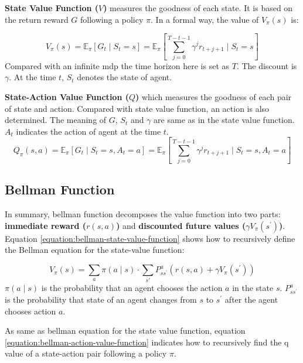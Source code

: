 \textbf{State Value Function ($V$)} measures the goodness of each state. It is based on the return reward $G$ following a policy $\pi$. In a formal way, the value of $V_\pi(s)$ is:

\begin{equation} 
V_{\pi}(s)=\mathbb{E}_{\pi}\left[G_{t} \mid S_{t}=s \right]=\mathbb{E}_{\pi}\left[\sum_{j=0}^{T-t-1} \gamma^{j} r_{t+j+1} \mid S_{t}=s\right]
\end{equation}
Compared with an infinite \gls{mdp} the time horizon here is set as $T$. The discount is $\gamma$. At the time $t$, $S_t$ denotes the state of agent.

\textbf{State-Action Value Function ($Q$)} which measures the goodness of each pair of state and action. Compared with state value function, an action is also determined. The meaning of $G$, $S_t$ and $\gamma$ are same as in the state value function. $A_t$ indicates the action of agent at the time $t$.
\begin{equation}
Q_{\pi}(s, a)=\mathbb{E}_{\pi}\left[G_{t} \mid S_{t}=s, A_{t}=a\right]=\mathbb{E}_{\pi}\left[\sum_{j=0}^{T-t-1} \gamma^{j} r_{t+j+1} \mid S_{t}=s, A_{t}=a\right]
\end{equation}

\subsection{Bellman Function}
In summary, bellman function decomposes the value function into two parts: \textbf{immediate reward ($r(s, a)$)} and \textbf{discounted future values ($\gamma V_{\pi}\left(s^{\prime}\right)$)}.
Equation \ref{equation:bellman-state-value-function} shows how to recursively define the Bellman equation for the state-value function:

\begin{equation} \label{equation:bellman-state-value-function}
V_{\pi}(s)=\sum_{a} \pi(a \mid s) \cdot \sum_{s \prime} P_{s s^{\prime}}^{a}\left(r(s, a)+\gamma V_{\pi}\left(s^{\prime}\right)\right)
\end{equation}
$\pi(a \mid s)$ is the probability that an agent chooses the action $a$ in the state $s$. $P_{s s^{\prime}}^{a}$ is the probability that state of an agent changes from $s$ to $s^{\prime}$ after the agent chooses action $a$.

As same as bellman equation for the state value function, equation \ref{equation:bellman-action-value-function} indicates how to recursively find the q value of a state-action pair following a policy $\pi$.

